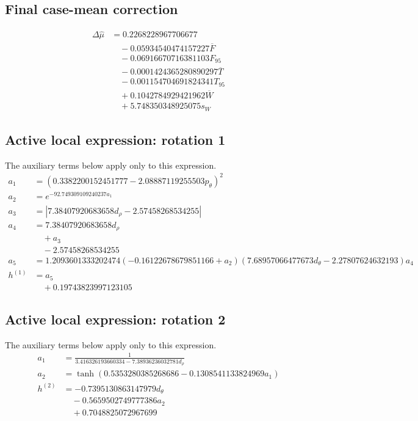 \subsection*{Final case-mean correction}
\begin{align*}
\Delta\widehat{\mu} &= 0.2268228967706677 \\
&\quad - 0.05934540474157227 \overline{F} \\
&\quad - 0.06916670716381103 F_{95} \\
&\quad - 0.0001424365280890297 \overline{T} \\
&\quad - 0.001154704691824341 T_{95} \\
&\quad + 0.1042784929421962 \overline{W} \\
&\quad + 5.748350348925075 s_W
\end{align*}

\subsection*{Active local expression: rotation 1}
The auxiliary terms below apply only to this expression.
\begin{align*}
a_{1} &= \left(0.3382200152451777 - 2.08887119255503 p_\theta\right)^{2} \\
a_{2} &= e^{- 92.749309109240237 a_{1}} \\
a_{3} &= \left|{7.38407920683658 d_\rho - 2.57458268534255}\right| \\
a_{4} &= 7.38407920683658 d_\rho \\
&\quad + a_{3} \\
&\quad - 2.57458268534255 \\
a_{5} &= 1.2093601333202474 \left(-0.16122678679851166 + a_{2}\right) \left(7.68957066477673 d_\theta - 2.27807624632193\right) a_{4} \\
h^{(1)} &= a_{5} \\
&\quad + 0.19743823997123105
\end{align*}

\subsection*{Active local expression: rotation 2}
The auxiliary terms below apply only to this expression.
\begin{align*}
a_{1} &= \frac{1}{3.416326193660334 - 7.38936236032781 d_\rho} \\
a_{2} &= \tanh{\left(0.5353280385268686 - 0.1308541133824969 a_{1} \right)} \\
h^{(2)} &= - 0.7395130863147979 d_\theta \\
&\quad - 0.5659502749777386 a_{2} \\
&\quad + 0.7048825072967699
\end{align*}

